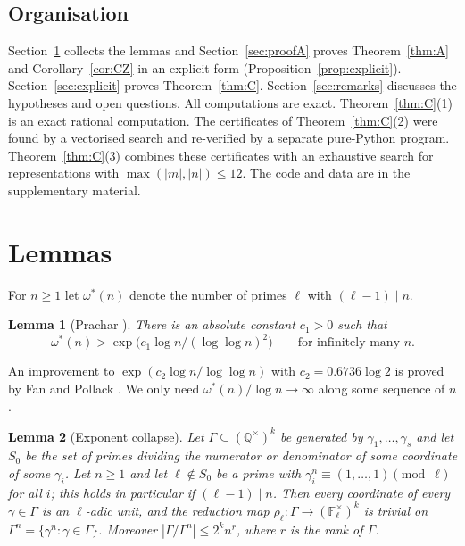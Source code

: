 \documentclass[11pt]{amsart}
\newtheorem{lemma}{Lemma}[section]
\theoremstyle{definition}
\theoremstyle{remark}
\newcommand{\Q}{\mathbb{Q}}
\newcommand{\F}{\mathbb{F}}
\begin{document}
\subsection*{Organisation}
Section~\ref{sec:lemmas} collects the lemmas and Section~\ref{sec:proofA} proves Theorem~\ref{thm:A} and Corollary~\ref{cor:CZ} in an explicit form (Proposition~\ref{prop:explicit}).
Section~\ref{sec:explicit} proves Theorem~\ref{thm:C}.
Section~\ref{sec:remarks} discusses the hypotheses and open questions.
All computations are exact.
Theorem~\ref{thm:C}(1) is an exact rational computation.
The certificates of Theorem~\ref{thm:C}(2) were found by a vectorised search and re-verified by a separate pure-Python program.
Theorem~\ref{thm:C}(3) combines these certificates with an exhaustive search for representations with $\max(|m|,|n|)\le12$.
The code and data are in the supplementary material.

\section{Lemmas}\label{sec:lemmas}

For $n\ge1$ let $\omega^*(n)$ denote the number of primes $\ell$ with $(\ell-1)\mid n$.

\begin{lemma}[Prachar {\cite{Pra55}}]\label{lem:prachar}
There is an absolute constant $c_1>0$ such that
\[
\omega^*(n)>\exp\bigl(c_1\log n/(\log\log n)^2\bigr)\qquad\text{for infinitely many }n.
\]
\end{lemma}

An improvement to $\exp(c_2\log n/\log\log n)$ with $c_2=0.6736\log2$ is proved by Fan and Pollack \cite{FP25}.
We only need $\omega^*(n)/\log n\to\infty$ along some sequence of $n$.

\begin{lemma}[Exponent collapse]\label{lem:collapse}
Let $\Gamma\subseteq(\Q^\times)^k$ be generated by $\gamma_1,\dots,\gamma_s$ and let $S_0$ be the set of primes dividing the numerator or denominator of some coordinate of some $\gamma_i$.
Let $n\ge1$ and let $\ell\notin S_0$ be a prime with $\gamma_i^n\equiv(1,\dots,1)\pmod\ell$ for all $i$; this holds in particular if $(\ell-1)\mid n$.
Then every coordinate of every $\gamma\in\Gamma$ is an $\ell$-adic unit, and the reduction map $\rho_\ell:\Gamma\to(\F_\ell^\times)^k$ is trivial on $\Gamma^n=\{\gamma^n:\gamma\in\Gamma\}$.
Moreover $|\Gamma/\Gamma^n|\le2^kn^r$, where $r$ is the rank of $\Gamma$.
\end{lemma}
\end{document}
